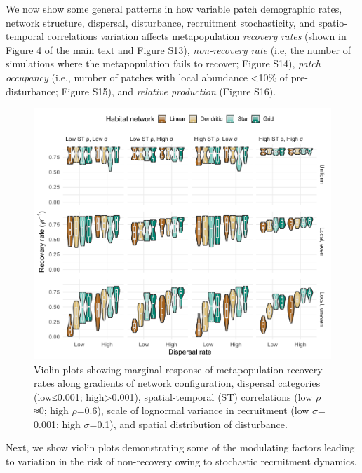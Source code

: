 \documentclass[
]{article}
\begin{document}
We now show some general patterns in how variable patch demographic
rates, network structure, dispersal, disturbance, recruitment
stochasticity, and spatio-temporal correlations variation affects
metapopulation \emph{recovery rates} (shown in Figure 4 of the main text
and Figure S13), \emph{non-recovery rate} (i.e, the number of
simulations where the metapopulation fails to recover; Figure S14),
\emph{patch occupancy} (i.e., number of patches with local abundance
\textless10\% of pre-disturbance; Figure S15), and \emph{relative
production} (Figure S16).

\begin{figure}[H]

{\centering \includegraphics{Managing_for_ecological_surprises_in_metapopulations_files/figure-latex/violin plots of risk of recovery rates-1} 

}

\caption{Violin plots showing marginal response of metapopulation recovery rates along gradients of network configuration, dispersal categories (low≤0.001; high>0.001), spatial-temporal (ST) correlations (low $\rho$≈0; high $\rho$=0.6), scale of lognormal variance in recruitment (low $\sigma$= 0.001; high $\sigma$=0.1), and spatial distribution of disturbance.}\label{fig:violin plots of risk of recovery rates}
\end{figure}

Next, we show violin plots demonstrating some of the modulating factors
leading to variation in the risk of non-recovery owing to stochastic
recruitment dynamics.
\end{document}
